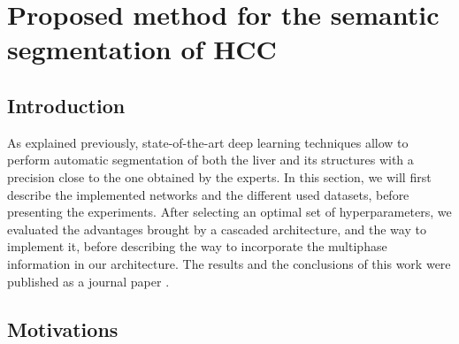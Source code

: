 


\chapter{Proposed method for the semantic segmentation of HCC} \label{chapter:IJCARS}


\section{Introduction}
As explained previously, state-of-the-art deep learning techniques allow to perform automatic segmentation of both the liver and
its structures with a precision close to the one obtained by the experts.
In this section, we will first describe the implemented
networks and the different used datasets, before presenting the experiments.
After selecting an optimal set of hyperparameters, we evaluated the
advantages brought by a cascaded architecture, and the way to implement
it, before describing the way to incorporate the multiphase information
in our architecture.
The results and the conclusions of this work were published as a journal paper \cite{Ouhmich2019}.


\section{Motivations}

